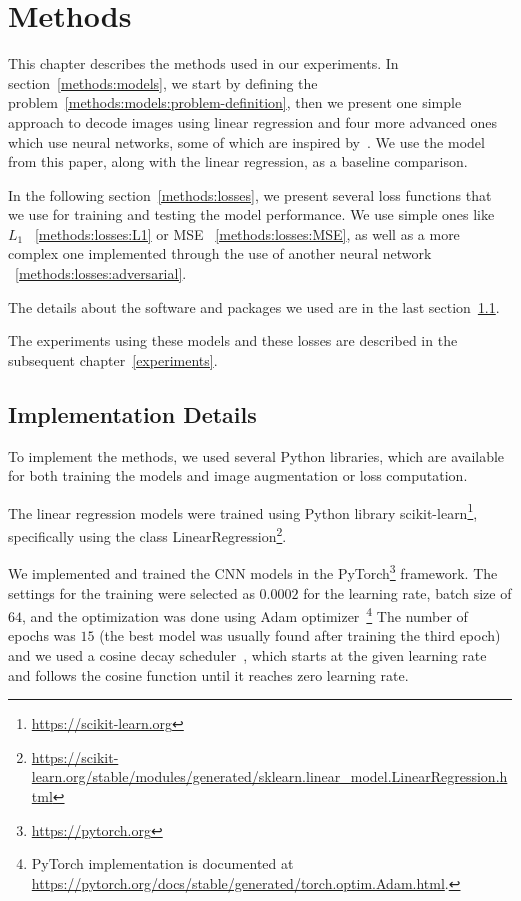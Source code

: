 \chapter{Methods}
\label{methods}
This chapter describes the methods used in our experiments. In section~\ref{methods:models}, we start by defining the problem~\ref{methods:models:problem-definition}, then we present one simple approach to decode images using linear regression and four more advanced ones which use neural networks, some of which are inspired by~\citep{zhang2020reconstruction}. We use the model from this paper, along with the linear regression, as a baseline comparison.

In the following section~\ref{methods:losses}, we present several loss functions that we use for training and testing the model performance. We use simple ones like $L_1$ ~\ref{methods:losses:L1} or MSE ~\ref{methods:losses:MSE}, as well as a more complex one implemented through the use of another neural network ~\ref{methods:losses:adversarial}.

The details about the software and packages we used are in the last section~\ref{methods:implementation-details}.

The experiments using these models and these losses are described in the subsequent chapter~\ref{experiments}.







\section{Implementation Details}
\label{methods:implementation-details}
To implement the methods, we used several Python libraries, which are available for both training the models and image augmentation or loss computation.

The linear regression models were trained using Python library scikit-learn\footnote{\url{https://scikit-learn.org}}, specifically using the class LinearRegression\footnote{\url{https://scikit-learn.org/stable/modules/generated/sklearn.linear_model.LinearRegression.html}}.

We implemented and trained the CNN models in the PyTorch\footnote{\url{https://pytorch.org}} framework. The settings for the training were selected as $0.0002$ for the learning rate, batch size of $64$, and the optimization was done using Adam optimizer~\citep{kingma2014adam}\footnote{PyTorch implementation is documented at \url{https://pytorch.org/docs/stable/generated/torch.optim.Adam.html}.} The number of epochs was $15$ (the best model was usually found after training the third epoch) and we used a cosine decay scheduler~\citep{loshchilov2016sgdr}, which starts at the given learning rate and follows the cosine function until it reaches zero learning rate.

